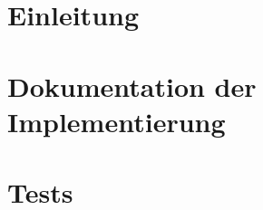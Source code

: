 \documentclass[a4paper]{article}
\begin{document}
	

\newpage

\tableofcontents

\newpage

\section{Einleitung}

\section{Dokumentation der Implementierung}

\section{Tests}



\end{document}
